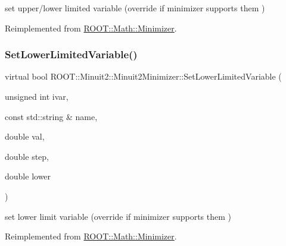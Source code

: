set upper/lower limited variable (override if minimizer supports them ) 



Reimplemented from \mbox{\hyperlink{classROOT_1_1Math_1_1Minimizer_a4303530cbb62ceb7cf9c9ebcbde530c2}{R\+O\+O\+T\+::\+Math\+::\+Minimizer}}.

\mbox{\label{classROOT_1_1Minuit2_1_1Minuit2Minimizer_af38926946e36f7030cfc1c298ab9b222}} 
\subsubsection{\texorpdfstring{SetLowerLimitedVariable()}{SetLowerLimitedVariable()}\hspace{0.1cm}{\footnotesize\ttfamily [1/3]}}
{\footnotesize\ttfamily virtual bool R\+O\+O\+T\+::\+Minuit2\+::\+Minuit2\+Minimizer\+::\+Set\+Lower\+Limited\+Variable (\begin{DoxyParamCaption}\item[{unsigned int}]{ivar,  }\item[{const std\+::string \&}]{name,  }\item[{double}]{val,  }\item[{double}]{step,  }\item[{double}]{lower }\end{DoxyParamCaption})\hspace{0.3cm}{\ttfamily [virtual]}}



set lower limit variable (override if minimizer supports them ) 



Reimplemented from \mbox{\hyperlink{classROOT_1_1Math_1_1Minimizer_a0fed20bdc58d05ce2b92d2bf47594dfb}{R\+O\+O\+T\+::\+Math\+::\+Minimizer}}.

\mbox{\label{classROOT_1_1Minuit2_1_1Minuit2Minimizer_af38926946e36f7030cfc1c298ab9b222}} 
